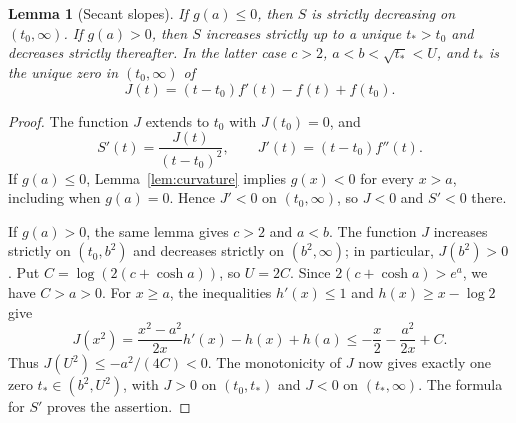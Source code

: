 \documentclass[11pt]{article}
\newtheorem{lemma}{Lemma}
\begin{document}
\begin{lemma}[Secant slopes]\label{lem:shape}
If $g(a)\leq0$, then $S$ is strictly decreasing on $(t_0,\infty)$.
If $g(a)>0$, then $S$ increases strictly up to a unique
$t_*>t_0$ and decreases strictly thereafter. In the latter case
$c>2$, $a<b<\sqrt{t_*}<U$, and $t_*$ is the unique zero in $(t_0,\infty)$ of
\begin{equation}\label{eq:J}
 J(t)=(t-t_0)f'(t)-f(t)+f(t_0).
\end{equation}
\end{lemma}
\begin{proof}
The function $J$ extends to $t_0$ with $J(t_0)=0$, and
\[
 S'(t)=\frac{J(t)}{(t-t_0)^2},\qquad
 J'(t)=(t-t_0)f''(t).
\]
If $g(a)\leq0$, Lemma~\ref{lem:curvature} implies $g(x)<0$ for every
$x>a$, including when $g(a)=0$. Hence $J'<0$ on $(t_0,\infty)$, so
$J<0$ and $S'<0$ there.

If $g(a)>0$, the same lemma gives $c>2$ and $a<b$. The function $J$
increases strictly on $(t_0,b^2)$ and decreases strictly on
$(b^2,\infty)$; in particular, $J(b^2)>0$. Put
$C=\log(2(c+\cosh a))$, so $U=2C$. Since
$2(c+\cosh a)>e^a$, we have $C>a>0$. For $x\geq a$, the inequalities
$h'(x)\leq1$ and $h(x)\geq x-\log2$ give
\[
 J(x^2)=\frac{x^2-a^2}{2x}h'(x)-h(x)+h(a)
 \leq-\frac{x}{2}-\frac{a^2}{2x}+C.
\]
Thus $J(U^2)\leq-a^2/(4C)<0$. The monotonicity of $J$ now gives exactly
one zero $t_*\in(b^2,U^2)$, with $J>0$ on $(t_0,t_*)$ and $J<0$ on
$(t_*,\infty)$. The formula for $S'$ proves the assertion.
\end{proof}
\end{document}
